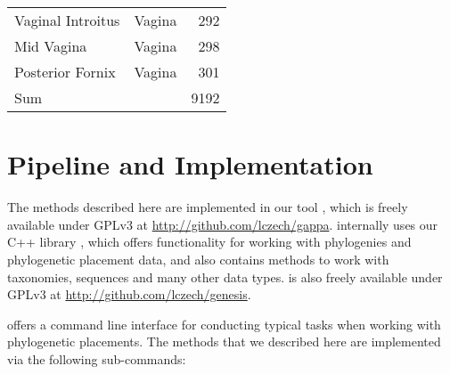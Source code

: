 \begin{table}[htb]
{\begin{center}
\begin{tabular}{llr}
        Vaginal Introitus               & Vagina            & 292   \\
        Mid Vagina                      & Vagina            & 298   \\
        Posterior Fornix                & Vagina            & 301   \\
        Sum                             &                   & 9192  \\
        \bottomrule
    \end{tabular}
    \end{center}
}
\end{table}


\cleardoublepage

\chapter{Pipeline and Implementation}
\label{ch:PipelineImplementation}



The methods described here are implemented in our tool ,
which is freely available under GPLv3 at \url{http://github.com/lczech/gappa}.
 internally uses our C++ library ,
which offers functionality for working with phylogenies and phylogenetic placement data,
and also contains methods to work with taxonomies, sequences and many other data types.
 is also freely available under GPLv3 at \url{http://github.com/lczech/genesis}.

 offers a command line interface for conducting typical tasks when working with phylogenetic placements.
The methods that we described here are implemented via the following sub-commands:

